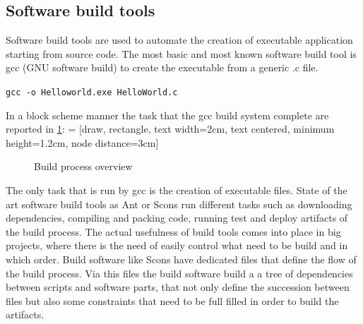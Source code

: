 \documentclass[../main.tex]{subfiles}
\begin{document}
\subsection{Software build tools}\label{ssec:scons12}
Software build tools are used to automate the creation of executable application starting from source code. The most basic and most known software build tool is gcc (GNU software build) to create the executable from a generic .c file. 
\begin{center}
    \texttt{gcc -o Helloworld.exe HelloWorld.c}
\end{center}
In a block scheme manner the task that the gcc build system complete are reported in \ref{Buildpro}:
 = [draw, rectangle, text width=2cm, text centered, minimum height=1.2cm, node distance=3cm]
\begin{figure}[h]
  \centering
{}
  \caption{Build process overview}
  \label{Buildpro}
\end{figure}
The only task that is run by gcc is the creation of executable files. State of the art software build tools as Ant or Scons run different tasks such as downloading dependencies, compiling and packing code, running test and deploy artifacts of the build process. The actual usefulness of build tools comes into place in big projects, where there is the need of easily control what need to be build and in which order. Build software like Scons have dedicated files that define the flow of the build process. Via this files the build software build a a tree of dependencies between scripts and software parts, that not only define the succession between files but also some constraints that need to be full filled in order to build the artifacts.\\
\end{document}
